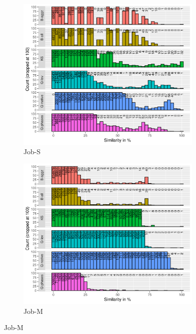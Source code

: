 \documentclass{jhps}
\begin{document}
\begin{figure}
\centering

\begin{subfigure}{0.7\textwidth}
\centering
\includegraphics[width=\textwidth,trim={0 0 0 2.0cm},clip]{job_similarities_4296426-out/hist-sim}
\caption{Job-S}\label{fig:hist-job-S}
\end{subfigure}

\begin{subfigure}{0.7\textwidth}
\centering
\includegraphics[width=\textwidth,trim={0 0 0 2.0cm},clip]{job_similarities_5024292-out/hist-sim}
\caption{Job-M}\label{fig:hist-job-M}
\end{subfigure}


\end{figure}
\end{document}

